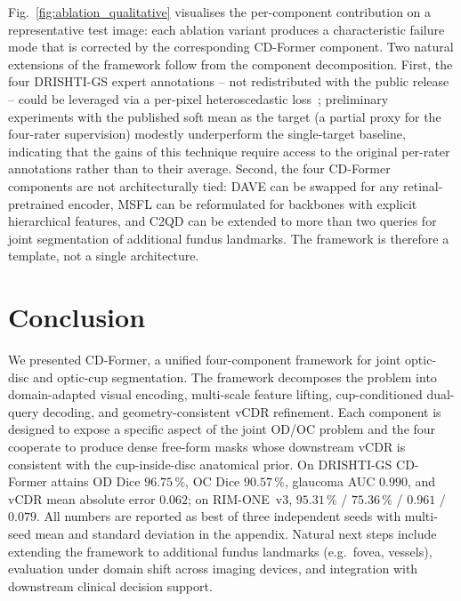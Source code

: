 \documentclass[runningheads]{llncs}
\begin{document}
Fig.~\ref{fig:ablation_qualitative} visualises the per-component contribution on a representative test image: each ablation variant produces a characteristic failure mode that is corrected by the corresponding CD-Former component. Two natural extensions of the framework follow from the component decomposition. First, the four DRISHTI-GS expert annotations -- not redistributed with the public release -- could be leveraged via a per-pixel heteroscedastic loss~\cite{kendall2017uncertainty}; preliminary experiments with the published soft mean as the target (a partial proxy for the four-rater supervision) modestly underperform the single-target baseline, indicating that the gains of this technique require access to the original per-rater annotations rather than to their average. Second, the four CD-Former components are not architecturally tied: DAVE can be swapped for any retinal-pretrained encoder, MSFL can be reformulated for backbones with explicit hierarchical features, and C2QD can be extended to more than two queries for joint segmentation of additional fundus landmarks. The framework is therefore a template, not a single architecture.


\section{Conclusion}

We presented CD-Former, a unified four-component framework for joint optic-disc and optic-cup segmentation. The framework decomposes the problem into domain-adapted visual encoding, multi-scale feature lifting, cup-conditioned dual-query decoding, and geometry-consistent vCDR refinement. Each component is designed to expose a specific aspect of the joint OD/OC problem and the four cooperate to produce dense free-form masks whose downstream vCDR is consistent with the cup-inside-disc anatomical prior. On DRISHTI-GS CD-Former attains OD Dice $96.75\,\%$, OC Dice $90.57\,\%$, glaucoma AUC $0.990$, and vCDR mean absolute error $0.062$; on RIM-ONE~v3, $95.31\,\%$ / $75.36\,\%$ / $0.961$ / $0.079$. All numbers are reported as best of three independent seeds with multi-seed mean and standard deviation in the appendix. Natural next steps include extending the framework to additional fundus landmarks (e.g.\ fovea, vessels), evaluation under domain shift across imaging devices, and integration with downstream clinical decision support.







\end{document}
